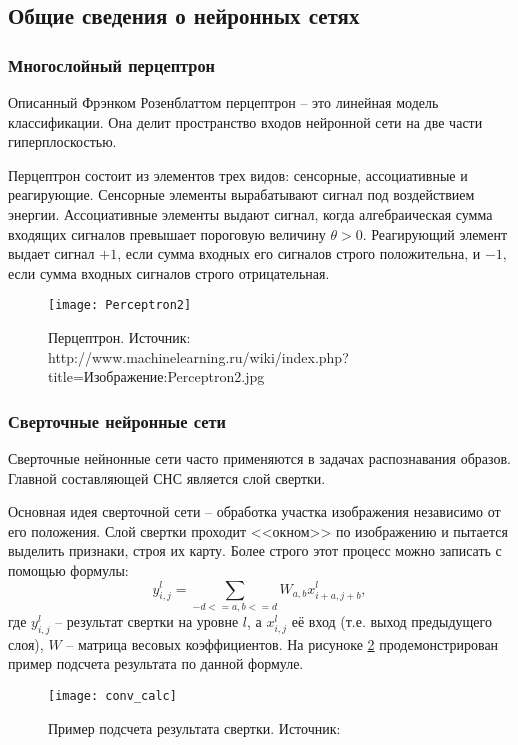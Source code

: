 \subsection{Общие сведения о нейронных сетях}
\subsubsection{Многослойный перцептрон}
Описанный Фрэнком Розенблаттом перцептрон -- это линейная модель классификации.
Она делит пространство входов нейронной сети на две части гиперплоскостью.

Перцептрон состоит из элементов трех видов: сенсорные, ассоциативные и
реагирующие. Сенсорные элементы вырабатывают сигнал под воздействием энергии.
Ассоциативные элементы выдают сигнал, когда алгебраическая сумма входящих
сигналов превышает пороговую величину $\theta > 0$. Реагирующий элемент выдает
сигнал $+1$, если сумма входных его сигналов строго положительна, и $-1$, если
сумма входных сигналов строго отрицательная.
\begin{figure}[h]
\centering
\texttt{[image: Perceptron2]}
\caption{Перцептрон. Источник: http://www.machinelearning.ru/wiki/index.php?title=Изображение:Perceptron2.jpg}
\label{fig:perceptron}
\end{figure}
\subsubsection{Сверточные нейронные сети}
Сверточные нейнонные сети часто применяются в задачах распознавания образов.
Главной составляющей СНС является слой свертки.

Основная идея сверточной сети -- обработка участка изображения независимо от
его положения. Слой свертки проходит <<окном>> по изображению и пытается
выделить признаки, строя их карту. Более строго этот процесс можно записать
с помощью формулы:
\[
y^{l}_{i, j} = \sum_{-d<=a,b<=d} W_{a,b}x^l_{i + a, j + b},
\]
где $y^l_{i, j}$ -- результат свертки на уровне $l$, а $x^l_{i, j}$ её вход (т.е.
выход предыдущего слоя), $W$ -- матрица весовых коэффициентов\cite{deeplearning}. 
На рисуноке \ref{fig:conv_calc} продемонстрирован пример подсчета результата по 
данной формуле.
\begin{figure}[h]
\centering
\texttt{[image: conv\_calc]}
\caption{Пример подсчета результата свертки. Источник: \cite{deeplearning}}
\label{fig:conv_calc}
\end{figure}


